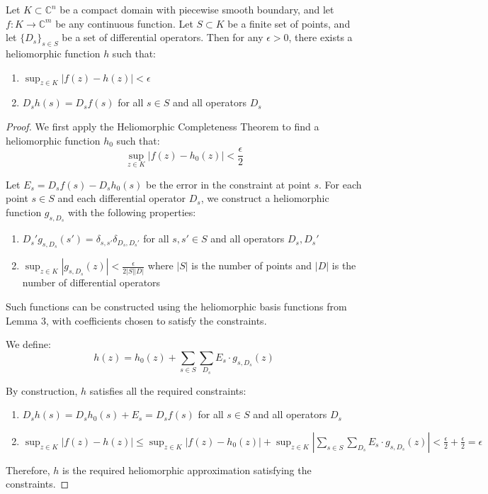 \begin{theorem}
Let $K \subset \mathbb{C}^n$ be a compact domain with piecewise smooth boundary, and let $f: K \rightarrow \mathbb{C}^m$ be any continuous function. Let $S \subset K$ be a finite set of points, and let $\{D_s\}_{s \in S}$ be a set of differential operators. Then for any $\epsilon > 0$, there exists a heliomorphic function $h$ such that:
\begin{enumerate}
    \item $\sup_{z \in K} |f(z) - h(z)| < \epsilon$
    \item $D_sh(s) = D_sf(s)$ for all $s \in S$ and all operators $D_s$
\end{enumerate}
\end{theorem}

\begin{proof}
We first apply the Heliomorphic Completeness Theorem to find a heliomorphic function $h_0$ such that:
\begin{equation}
\sup_{z \in K} |f(z) - h_0(z)| < \frac{\epsilon}{2}
\end{equation}

Let $E_s = D_sf(s) - D_sh_0(s)$ be the error in the constraint at point $s$. For each point $s \in S$ and each differential operator $D_s$, we construct a heliomorphic function $g_{s,D_s}$ with the following properties:
\begin{enumerate}
    \item $D_s'g_{s,D_s}(s') = \delta_{s,s'}\delta_{D_s,D_s'}$ for all $s, s' \in S$ and all operators $D_s, D_s'$
    \item $\sup_{z \in K} |g_{s,D_s}(z)| < \frac{\epsilon}{2|S||D|}$ where $|S|$ is the number of points and $|D|$ is the number of differential operators
\end{enumerate}

Such functions can be constructed using the heliomorphic basis functions from Lemma 3, with coefficients chosen to satisfy the constraints.

We define:
\begin{equation}
h(z) = h_0(z) + \sum_{s \in S}\sum_{D_s} E_s \cdot g_{s,D_s}(z)
\end{equation}

By construction, $h$ satisfies all the required constraints:
\begin{enumerate}
    \item $D_sh(s) = D_sh_0(s) + E_s = D_sf(s)$ for all $s \in S$ and all operators $D_s$
    \item $\sup_{z \in K} |f(z) - h(z)| \leq \sup_{z \in K} |f(z) - h_0(z)| + \sup_{z \in K} \left|\sum_{s \in S}\sum_{D_s} E_s \cdot g_{s,D_s}(z)\right| < \frac{\epsilon}{2} + \frac{\epsilon}{2} = \epsilon$
\end{enumerate}

Therefore, $h$ is the required heliomorphic approximation satisfying the constraints.
\end{proof}

